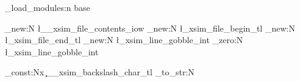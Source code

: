 % 
% 
% 
% 
% 

\xsim_load_modules:n {base}

\iow_new:N  \l__xsim_file_contents_iow
\tl_new:N   \l_xsim_file_begin_tl
\tl_new:N   \l_xsim_file_end_tl
\int_new:N  \l_xsim_line_gobble_int
\int_zero:N \l_xsim_line_gobble_int

\tl_const:Nx \c__xsim_backslash_char_tl { \cs_to_str:N \\ }

